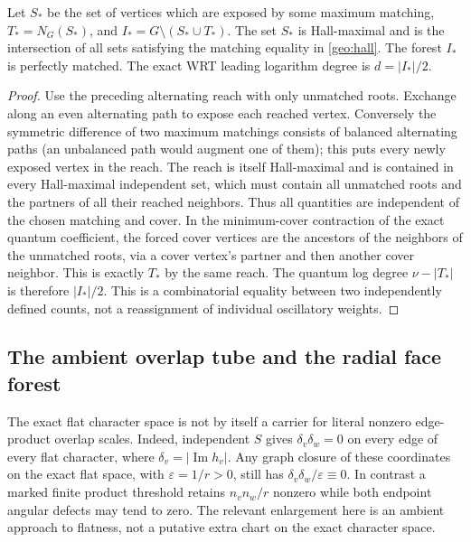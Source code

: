 \begin{corollary}\label{geo:forced}
Let \(S_*\) be the set of vertices which are exposed by some maximum matching, \(T_*=N_G(S_*)\), and \(I_*=G\setminus(S_*\cup T_*)\). The set \(S_*\) is Hall-maximal and is the intersection of all sets satisfying the matching equality in \eqref{geo:hall}. The forest \(I_*\) is perfectly matched. The exact WRT leading logarithm degree is \(d=|I_*|/2\).
\end{corollary}
\begin{proof}
Use the preceding alternating reach with only unmatched roots. Exchange along an even alternating path to expose each reached vertex. Conversely the symmetric difference of two maximum matchings consists of balanced alternating paths (an unbalanced path would augment one of them); this puts every newly exposed vertex in the reach. The reach is itself Hall-maximal and is contained in every Hall-maximal independent set, which must contain all unmatched roots and the partners of all their reached neighbors. Thus all quantities are independent of the chosen matching and cover. In the minimum-cover contraction of the exact quantum coefficient, the forced cover vertices are the ancestors of the neighbors of the unmatched roots, via a cover vertex's partner and then another cover neighbor. This is exactly \(T_*\) by the same reach. The quantum log degree \(\nu-|T_*|\) is therefore \(|I_*|/2\). This is a combinatorial equality between two independently defined counts, not a reassignment of individual oscillatory weights.
\end{proof}

\subsection{The ambient overlap tube and the radial face forest}
The exact flat character space is not by itself a carrier for literal nonzero edge-product overlap scales. Indeed, independent \(S\) gives
\(\delta_v\delta_w=0\) on every edge of every flat character, where
\(\delta_v=|\operatorname{Im}h_v|\). Any graph closure of these coordinates on the exact flat space, with \(\varepsilon=1/r>0\), still has \(\delta_v\delta_w/\varepsilon\equiv0\). In contrast a marked finite product threshold retains \(n_vn_w/r\) nonzero while both endpoint angular defects may tend to zero. The relevant enlargement here is an ambient approach to flatness, not a putative extra chart on the exact character space.

